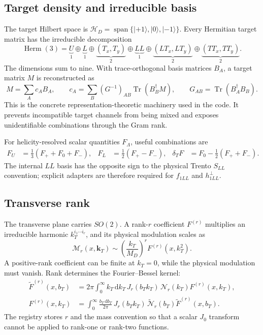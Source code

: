 \documentclass[11pt]{article}
\newcommand{\kT}{\bm{k}_{T}}
\newcommand{\Tr}{\operatorname{Tr}}
\newcommand{\dd}{\mathrm{d}}
\begin{document}
\subsection{Target density and irreducible basis}

The target Hilbert space is
\(\mathcal H_D=\operatorname{span}\{|+1\rangle,|0\rangle,|-1\rangle\}\).
Every Hermitian target matrix has the irreducible decomposition
\begin{equation}
\operatorname{Herm}(3)
=
\underbrace{U}_{1}
\oplus\underbrace{L}_{1}
\oplus\underbrace{(T_x,T_y)}_{2}
\oplus\underbrace{LL}_{1}
\oplus\underbrace{(LT_x,LT_y)}_{2}
\oplus\underbrace{(TT_x,TT_y)}_{2}.
\label{eq:spin1-decomp}
\end{equation}
The dimensions sum to nine.  With trace-orthogonal basis matrices
\(B_A\), a target matrix \(M\) is reconstructed as
\begin{equation}
M=\sum_A c_A B_A,\qquad
c_A=\sum_B(G^{-1})_{AB}\Tr(B_B^\dagger M),\qquad
G_{AB}=\Tr(B_A^\dagger B_B).
\label{eq:gram-project}
\end{equation}
This is the concrete representation-theoretic machinery used in the code.
It prevents incompatible target channels from being mixed and exposes
unidentifiable combinations through the Gram rank.

For helicity-resolved scalar quantities \(F_\Lambda\), useful combinations
are
\begin{align}
F_U&=\frac13(F_++F_0+F_-),&
F_L&=\frac12(F_+-F_-),&
\delta_TF&=F_0-\frac12(F_++F_-).
\label{eq:helicity-combos}
\end{align}
The internal \(LL\) basis has the opposite sign to the physical Trento
\(S_{LL}\) convention; explicit adapters are therefore required for
\(f_{1LL}\) and \(h_{1LL}^{\perp}\).

\subsection{Transverse rank}

The transverse plane carries \(SO(2)\).  A rank-\(r\) coefficient
\(F^{(r)}\) multiplies an irreducible harmonic
\(k_T^{i_1\cdots i_r}\), and its physical modulation scales as
\begin{equation}
\mathcal M_r(x,\kT)\sim
\left(\frac{k_T}{M_D}\right)^rF^{(r)}(x,k_T^2).
\label{eq:rank-weight}
\end{equation}
A positive-rank coefficient can be finite at \(k_T=0\), while the physical
modulation must vanish.  Rank determines the Fourier--Bessel kernel:
\begin{align}
\widetilde F^{(r)}(x,b_T)
 &=2\pi\int_0^\infty k_T\,\dd k_T\,
 J_r(b_Tk_T)\,\mathcal N_r(k_T)F^{(r)}(x,k_T),\\
F^{(r)}(x,k_T)
 &=\int_0^\infty\frac{b_T\,\dd b_T}{2\pi}\,
 J_r(b_Tk_T)\,\widetilde{\mathcal N}_r(b_T)
 \widetilde F^{(r)}(x,b_T).
\label{eq:bessel}
\end{align}
The registry stores \(r\) and the mass convention so that a scalar
\(J_0\) transform cannot be applied to rank-one or rank-two functions.
\end{document}
